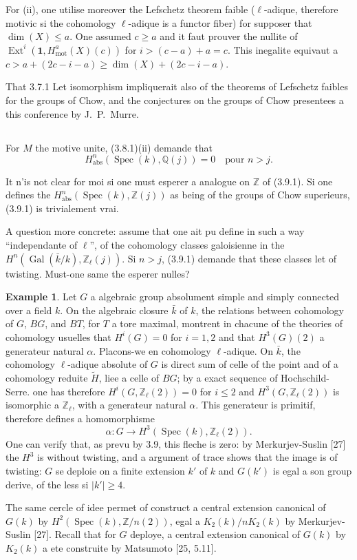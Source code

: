 \documentclass[11pt,a4paper]{article}
\theoremstyle{plain}
\theoremstyle{definition}
\newtheorem{example}[theorem]{Example}
\DeclareMathOperator{\Ext}{Ext}
\DeclareMathOperator{\Spec}{Spec}
\DeclareMathOperator{\Gal}{Gal}
\newcommand{\Q}{\mathbb{Q}}
\newcommand{\Z}{\mathbb{Z}}
\DeclareMathOperator{\mot}{mot}
\newcommand{\abs}{\mathrm{abs}}
\begin{document}
For (ii), one utilise moreover the Lefschetz theorem faible ($\ell$-adique, therefore motivic si the cohomology $\ell$-adique is a functor fiber) for supposer that $\dim(X) \leq a$. One assumed $c \geq a$ and it faut prouver the nullite of $\Ext^i(\mathbf{1}, H^a_{\mot}(X)(c))$ for $i > (c-a) + a = c$. This inegalite equivaut a $c > a + (2c - i - a) \geq \dim(X) + (2c - i - a)$.

That 3.7.1 Let isomorphism impliquerait also of the theorems of Lefschetz faibles for the groups of Chow, and the conjectures on the groups of Chow presentees a this conference by J.~P.~Murre.

\subsection{}

For $M$ the motive unite, (3.8.1)(ii) demande that
\begin{equation}
\tag{3.9.1}
H^n_{\abs}(\Spec(k), \Q(j)) = 0 \quad \text{pour } n > j.
\end{equation}

It n'is not clear for moi si one must esperer a analogue on $\Z$ of (3.9.1). Si one defines the $H^n_{\abs}(\Spec(k), \Z(j))$ as being of the groups of Chow superieurs, (3.9.1) is trivialement vrai.

A question more concrete: assume that one ait pu define in such a way ``independante of $\ell$'', of the cohomology classes galoisienne in the $H^n(\Gal(\bar{k}/k), \Z_\ell(j))$. Si $n > j$, (3.9.1) demande that these classes let of twisting. Must-one same the esperer nulles?

\begin{example}
Let $G$ a algebraic group absolument simple and simply connected over a field $k$. On the algebraic closure $\bar{k}$ of $k$, the relations between cohomology of $G$, $BG$, and $BT$, for $T$ a tore maximal, montrent in chacune of the theories of cohomology usuelles that $H^i(G) = 0$ for $i = 1, 2$ and that $H^3(G)(2)$ a generateur natural $\alpha$. Placons-we en cohomology $\ell$-adique. On $\bar{k}$, the cohomology $\ell$-adique absolute of $G$ is direct sum of celle of the point and of a cohomology reduite $\tilde{H}$, liee a celle of $BG$; by a exact sequence of Hochschild-Serre. one has therefore $H^i(G, \Z_\ell(2)) = 0$ for $i \leq 2$ and $H^3(G, \Z_\ell(2))$ is isomorphic a $\Z_\ell$, with a generateur natural $\alpha$. This generateur is primitif, therefore defines a homomorphisme
$$
\alpha: G \to H^3(\Spec(k), \Z_\ell(2)).
$$
One can verify that, as prevu by 3.9, this fleche is zero: by Merkurjev-Suslin [27] the $H^3$ is without twisting, and a argument of trace shows that the image is of twisting: $G$ se deploie on a finite extension $k'$ of $k$ and $G(k')$ is egal a son group derive, of the less si $|k'| \geq 4$.

The same cercle of idee permet of construct a central extension canonical of $G(k)$ by $H^2(\Spec(k), \Z/n(2))$, egal a $K_2(k)/nK_2(k)$ by Merkurjev-Suslin [27]. Recall that for $G$ deploye, a central extension canonical of $G(k)$ by $K_2(k)$ a ete construite by Matsumoto [25, 5.11].
\end{example}
\end{document}
